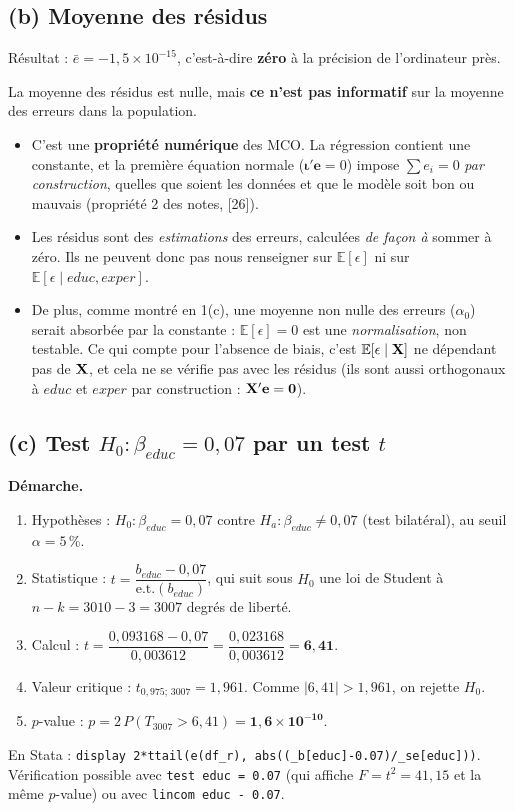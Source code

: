 \documentclass[11pt,a4paper]{article}
\newcommand{\ve}{\mathbf{e}}\newcommand{\vb}{\mathbf{b}}\newcommand{\vc}{\mathbf{c}}
\newcommand{\E}{\mathbb{E}}\newcommand{\Var}{\operatorname{Var}}\newcommand{\Cov}{\operatorname{Cov}}
\begin{document}
\subsection{(b) Moyenne des résidus}

Résultat : $\bar e=-1{,}5\times10^{-15}$, c'est-à-dire \textbf{zéro} à la précision de l'ordinateur près.

\begin{reponse}
La moyenne des résidus est nulle, mais \textbf{ce n'est pas informatif} sur la moyenne des erreurs dans la population.
\begin{itemize}[nosep]
\item C'est une \textbf{propriété numérique} des MCO. La régression contient une constante, et la première équation normale ($\bm\iota'\ve=0$) impose $\sum e_i=0$ \emph{par construction}, quelles que soient les données et que le modèle soit bon ou mauvais (propriété 2 des notes, [26]).
\item Les résidus sont des \emph{estimations} des erreurs, calculées \emph{de façon à} sommer à zéro. Ils ne peuvent donc pas nous renseigner sur $\E[\epsilon]$ ni sur $\E[\epsilon\mid educ,exper]$.
\item De plus, comme montré en 1(c), une moyenne non nulle des erreurs ($\alpha_0$) serait absorbée par la constante : $\E[\epsilon]=0$ est une \emph{normalisation}, non testable. Ce qui compte pour l'absence de biais, c'est $\E[\epsilon\mid\vX]$ ne dépendant pas de $\mathbf{X}$, et cela ne se vérifie pas avec les résidus (ils sont aussi orthogonaux à $educ$ et $exper$ par construction : $\vX'\ve=\mathbf 0$).
\end{itemize}
\end{reponse}

\subsection{(c) Test $H_0:\beta_{educ}=0{,}07$ par un test $t$}

\textbf{Démarche.}
\begin{enumerate}[nosep]
\item Hypothèses : $H_0:\beta_{educ}=0{,}07$ contre $H_a:\beta_{educ}\ne0{,}07$ (test bilatéral), au seuil $\alpha=5\,\%$.
\item Statistique : $t=\dfrac{b_{educ}-0{,}07}{\text{e.t.}(b_{educ})}$, qui suit sous $H_0$ une loi de Student à $n-k=3010-3=3007$ degrés de liberté.
\item Calcul : $t=\dfrac{0{,}093168-0{,}07}{0{,}003612}=\dfrac{0{,}023168}{0{,}003612}=\mathbf{6{,}41}$.
\item Valeur critique : $t_{0{,}975;\,3007}=1{,}961$. Comme $|6{,}41|>1{,}961$, on rejette $H_0$.
\item $p$-value : $p=2\,P(T_{3007}>6{,}41)=\mathbf{1{,}6\times10^{-10}}$.
\end{enumerate}
En Stata : \texttt{display 2*ttail(e(df\_r), abs((\_b[educ]-0.07)/\_se[educ]))}. Vérification possible avec \texttt{test educ = 0.07} (qui affiche $F=t^2=41{,}15$ et la même $p$-value) ou avec \texttt{lincom educ - 0.07}.
\end{document}
